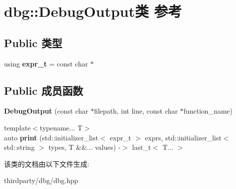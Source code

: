 \hypertarget{classdbg_1_1DebugOutput}{}\section{dbg\+:\+:Debug\+Output类 参考}
\label{classdbg_1_1DebugOutput}
\subsection*{Public 类型}
\begin{DoxyCompactItemize}
\item 
\mbox{\label{classdbg_1_1DebugOutput_a5d9b38d5b9276cb584c0e20e9b1a2045}} 
using {\bfseries expr\+\_\+t} = const char $\ast$
\end{DoxyCompactItemize}
\subsection*{Public 成员函数}
\begin{DoxyCompactItemize}
\item 
\mbox{\label{classdbg_1_1DebugOutput_a7bb0378758aa1006e2423eff57ee36a2}} 
{\bfseries Debug\+Output} (const char $\ast$filepath, int line, const char $\ast$function\+\_\+name)
\item 
\mbox{\label{classdbg_1_1DebugOutput_aa135787802db4a6b0b4eb185185e13ca}} 
{\footnotesize template$<$typename... T$>$ }\\auto {\bfseries print} (std\+::initializer\+\_\+list$<$ expr\+\_\+t $>$ exprs, std\+::initializer\+\_\+list$<$ std\+::string $>$ types, T \&\&... values) -\/$>$ last\+\_\+t$<$ T... $>$
\end{DoxyCompactItemize}


该类的文档由以下文件生成\+:\begin{DoxyCompactItemize}
\item 
thirdparty/dbg/dbg.\+hpp\end{DoxyCompactItemize}
